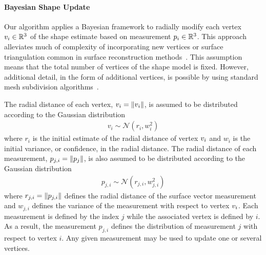 \documentclass[letterpaper, paper,11pt]{AAS}		%
\begin{document}
\paragraph{Bayesian Shape Update}

Our algorithm applies a Bayesian framework to radially modify each vertex \( v_i \in \mathbb{R}^3\) of the shape estimate based on measurement \( p_i \in \mathbb{R}^3 \). 
This approach alleviates much of complexity of incorporating new vertices or surface triangulation common in surface reconstruction methods~\cite{berg2008}.
This assumption means that the total number of vertices of the shape model is fixed.
However, additional detail, in the form of additional vertices, is possible by using standard mesh subdivision algorithms~\cite{orourke1998}.

The radial distance of each vertex, \( v_i = \left\| v_i \right\|\), is assumed to be distributed according to the Gaussian distribution
\begin{align*}
    v_i \sim \mathcal{N}(r_i, w_i^2)
\end{align*}
where \( r_i \) is the initial estimate of the radial distance of vertex \( v_i\) and \( w_i \) is the initial variance, or confidence, in the radial distance.
The radial distance of each measurement, \( p_{j,i} = \left\| p_j \right\|\), is also assumed to be distributed according to the Gaussian distribution
\begin{align*}
    p_{j,i} \sim \mathcal{N}(r_{j,i}, w_{j,i}^2)
\end{align*}
where \( r_{j,i} = \left\| p_{j,i} \right\| \) defines the radial distance of the surface vector measurement and \( w_{j, i}\) defines the variance of the measurement with respect to vertex \( v_i\).
Each measurement is defined by the index \( j \) while the associated vertex is defined by \( i \). 
As a result, the measurement \( p_{j, i} \) defines the distribution of measurement \( j \) with respect to vertex \( i \). 
Any given measurement may be used to update one or several vertices.
\end{document}
